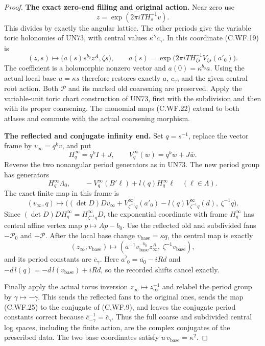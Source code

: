 \begin{proof}
\par\medskip\noindent\textbf{The exact zero-end filling and original action.}
Near zero use
\[
                    z=\exp(2\pi iT H_s^{-1}v).
\tag{C.WF.21}
\]
This divides by exactly the angular lattice.
The other periods give the variable toric holonomies
of UN73, with central values \(\kappa^\gamma c_\gamma\).
In this coordinate (C.WF.19) is
\[
 (z,s)\longmapsto
   \bigl(a(s)s^{b_0}z^A,\zeta s\bigr),\qquad
 a(s)=\exp\bigl(2\pi iT H_{\zeta s}^{-1}
                              V_{\zeta s}(a'_0)\bigr).
\tag{C.WF.22}
\]
The coefficient is a holomorphic nonzero vector and
\(a(0)=\kappa^{b_0}a\).
Using the actual local base \(u=\kappa s\)
therefore restores exactly \(a\), \(c_\gamma\),
and the given central root action.  Both
\(\mathscr P\) and its marked old coarsening are
preserved.  Apply the variable-unit toric chart
construction of UN73, first with the subdivision
and then with its proper coarsening.  The monomial
maps (C.WF.22) extend to both atlases and commute
with the actual coarsening morphism.

\par\medskip\noindent\textbf{The reflected and conjugate infinity end.}
Set \(q=s^{-1}\), replace the vector frame by
\(v_\infty=q^kv\), and put
\[
 H^\infty_q=q^kI+J,\qquad
 V^\infty_q(w)=q^kw+J\overline w .
\]
Reverse the two nonangular period generators as
in UN73.  The new period group has generators
\[
 H^\infty_q\Lambda_0,\qquad
 -V^\infty_q(B'\ell)+l(q)H^\infty_q\ell
                 \quad(\ell\in\Lambda).
\tag{C.WF.23}
\]
The exact finite map in this frame is
\[
 (v_\infty,q)\longmapsto
 \bigl((\det D)Dv_\infty+
       V^\infty_{\zeta^{-1}q}(a'_0)
       -l(q)V^\infty_{\zeta^{-1}q}(d),\
       \zeta^{-1}q\bigr).
\tag{C.WF.24}
\]
Since \((\det D)D H^\infty_q=
H^\infty_{\zeta^{-1}q}D\), the exponential
coordinate with frame \(H^\infty_q\) has central
affine vertex map \(p\mapsto Ap-b_0\).
Use the reflected old and subdivided fans
\(-\mathscr P_0\) and \(-\mathscr P\).
After the local base change \(v_{\mathrm{base}}=\kappa q\),
the central map is exactly
\[
 (z_\infty,v_{\mathrm{base}})
  \longmapsto
  (\overline a^{-1}v_{\mathrm{base}}^{-b_0}
                   z_\infty^A,\ \zeta^{-1}v_{\mathrm{base}}),
\tag{C.WF.25}
\]
and its period constants are \(\overline c_\gamma\).
Here \(\overline{a'_0}=\overline{a_0}-iRd\)
and \(-d\,l(q)=-d\,l(v_{\mathrm{base}})+iRd\),
so the recorded shifts cancel exactly.

Finally apply the actual torus inversion
\(z_\infty\mapsto z_\infty^{-1}\) and relabel the
period group by \(\gamma\mapsto-\gamma\).
This sends the reflected fans to the original
ones, sends the map (C.WF.25) to the conjugate
of (C.WF.9), and leaves the conjugate period
constants correct because
\(\overline c_{-\gamma}^{-1}=\overline c_\gamma\).
Thus the full coarse and subdivided central
log spaces, including the finite action, are
the complex conjugates of the prescribed data.
The two base coordinates satisfy
\(u\,v_{\mathrm{base}}=\kappa^2\).


\end{proof}
